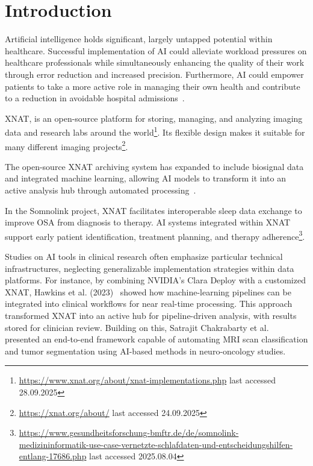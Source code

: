 

\chapter{Introduction}

Artificial intelligence holds significant, largely untapped potential within healthcare. Successful implementation of \ac{AI} could alleviate workload pressures on healthcare professionals while simultaneously enhancing the quality of their work through error reduction and increased precision. Furthermore, AI could empower patients to take a more active role in managing their own health and contribute to a reduction in avoidable hospital admissions~\cite{aung_promise_2021}.


XNAT, is an open-source platform for storing, managing, and analyzing imaging data and research labs around the world\footnote{\url{https://www.xnat.org/about/xnat-implementations.php}{ last accessed 28.09.2025}}. Its flexible design makes it suitable for many different imaging projects\footnote{\url{https://xnat.org/about/} last accessed 24.09.2025}.


The open-source XNAT archiving system has expanded to include biosignal data and integrated machine learning, allowing AI models to transform it into an active analysis hub through automated processing~\cite{marcus_extensible_2007}.

In the Somnolink project, XNAT facilitates interoperable sleep data exchange to improve \ac{OSA} from diagnosis to therapy. AI systems integrated within XNAT support early patient identification, treatment planning, and therapy  adherence\footnote{\url{https://www.gesundheitsforschung-bmftr.de/de/somnolink-medizininformatik-use-case-vernetzte-schlafdaten-und-entscheidungshilfen-entlang-17686.php}{ last accessed 2025.08.04}}.

Studies on AI tools in clinical research often emphasize particular technical infrastructures, neglecting generalizable implementation strategies within data platforms. For instance, by combining NVIDIA’s Clara Deploy with a customized XNAT, Hawkins et al. (2023)~\cite{hawkins_implementation_2023} showed how machine-learning pipelines can be integrated into clinical workflows for near real-time processing. This approach transformed XNAT into an active hub for pipeline-driven analysis, with results stored for clinician review. Building on this, Satrajit Chakrabarty et al. ~\cite{chakrabarty_deep_2023} presented an end-to-end framework capable of automating \ac{MRI} scan classification and tumor segmentation using AI-based methods in neuro-oncology studies.


